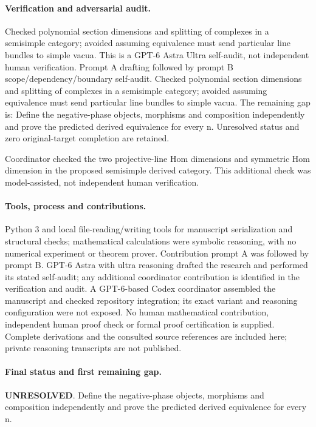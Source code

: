 \documentclass[11pt]{article}
\begin{document}
\paragraph{Verification and adversarial audit.}
Checked polynomial section dimensions and splitting of complexes in a semisimple category; avoided assuming equivalence must send particular line bundles to simple vacua. This is a GPT-6 Astra Ultra self-audit, not independent human verification. Prompt A drafting followed by prompt B scope/dependency/boundary self-audit. Checked polynomial section dimensions and splitting of complexes in a semisimple category; avoided assuming equivalence must send particular line bundles to simple vacua. The remaining gap is: Define the negative-phase objects, morphisms and composition independently and prove the predicted derived equivalence for every n. Unresolved status and zero original-target completion are retained.

Coordinator checked the two projective-line Hom dimensions and symmetric Hom dimension in the proposed semisimple derived category. This additional check was model-assisted, not independent human verification.

\paragraph{Tools, process and contributions.}
Python 3 and local file-reading/writing tools for manuscript serialization and structural checks; mathematical calculations were symbolic reasoning, with no numerical experiment or theorem prover. Contribution prompt A was followed by prompt B. GPT-6 Astra with ultra reasoning drafted the research and performed its stated self-audit; any additional coordinator contribution is identified in the verification and audit. A GPT-6-based Codex coordinator assembled the manuscript and checked repository integration; its exact variant and reasoning configuration were not exposed. No human mathematical contribution, independent human proof check or formal proof certification is supplied. Complete derivations and the consulted source references are included here; private reasoning transcripts are not published.

\paragraph{Final status and first remaining gap.}
\textbf{UNRESOLVED}. Define the negative-phase objects, morphisms and composition independently and prove the predicted derived equivalence for every n.
\end{document}
